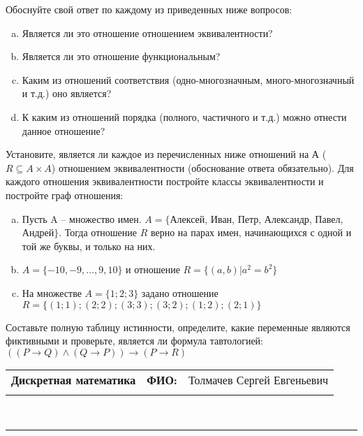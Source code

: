 \documentclass[10pt]{exam}
\newcommand{\class}{Дискретная математика}
\newcommand{\examdate}{}
\begin{document}
\begin{questions}
Обоснуйте свой ответ по каждому из приведенных ниже вопросов:
\begin{enumerate} [a)]\setcounter{enumi}{0}
    \item Является ли это отношение отношением эквивалентности?
    \item Является ли это отношение функциональным?
    \item Каким из отношений соответствия (одно-многозначным, много-многозначный и т.д.) оно является?
    \item К каким из отношений порядка (полного, частичного и т.д.) можно отнести данное отношение?
\end{enumerate}
\question
Установите, является ли каждое из перечисленных ниже отношений на А ($R \subseteq A \times A$) отношением эквивалентности (обоснование ответа обязательно). Для каждого отношения эквивалентности постройте классы 
эквивалентности и постройте граф отношения:
\begin{enumerate} [a)]\setcounter{enumi}{0}
\item Пусть A – множество имен. $A = \{ $Алексей, Иван, Петр, Александр, Павел, Андрей$ \}$. Тогда отношение $R$ верно на парах имен, начинающихся с одной и той же буквы, и только на них.
\item $A = \{-10, -9, … , 9, 10\}$ и отношение $ R = \{(a,b)|a^{2} = b^{2}\}$
\item На множестве $A = \{1; 2; 3\}$ задано отношение $R = \{(1; 1); (2; 2); (3; 3); (3; 2); (1; 2); (2; 1)\}$
\end{enumerate}\question Составьте полную таблицу истинности, определите, какие переменные являются фиктивными и проверьте, является ли формула тавтологией:
$(( P \rightarrow Q) \land (Q \rightarrow P)) \rightarrow (P \rightarrow R)$

\end{questions}
\newpage
\begin{flushright}
\begin{tabular}{p{2.8in} r l}
\textbf{\class} & \textbf{ФИО:} &Толмачев Сергей Евгеньевич
\\

\textbf{\examdate} &&\\
\end{tabular}\\
\end{flushright}
\rule[1ex]{\textwidth}{.1pt}
\end{document}
